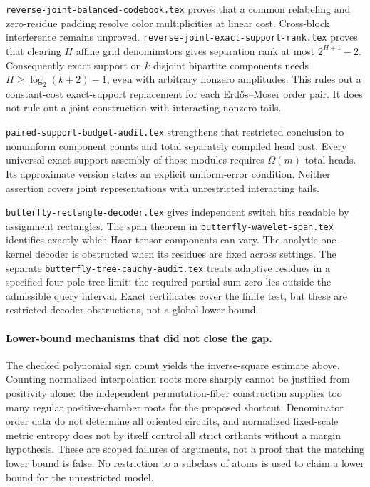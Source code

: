 \documentclass[11pt]{article}
\begin{document}
\texttt{reverse-joint-balanced-codebook.tex} proves that a common
relabeling and zero-residue padding resolve color multiplicities at
linear cost. Cross-block interference remains unproved.
\texttt{reverse-joint-exact-support-rank.tex} proves that clearing
$H$ affine grid denominators gives separation rank at most
$2^{H+1}-2$. Consequently exact support on $k$ disjoint bipartite
components needs $H\geq\log_2(k+2)-1$, even with arbitrary nonzero
amplitudes. This rules out a constant-cost exact-support replacement
for each Erd\H{o}s--Moser order pair. It does not rule out a joint
construction with interacting nonzero tails.

\texttt{paired-support-budget-audit.tex} strengthens that restricted
conclusion to nonuniform component counts and total separately compiled
head cost. Every universal exact-support assembly of those modules
requires $\Omega(m)$ total heads. Its approximate version states an
explicit uniform-error condition. Neither assertion covers joint
representations with unrestricted interacting tails.

\texttt{butterfly-rectangle-decoder.tex} gives independent switch bits
readable by assignment rectangles. The span theorem in
\texttt{butterfly-wavelet-span.tex} identifies exactly which Haar tensor
components can vary. The analytic one-kernel decoder is obstructed
when its residues are fixed across settings. The separate
\texttt{butterfly-tree-cauchy-audit.tex} treats adaptive residues in a
specified four-pole tree limit: the required partial-sum zero lies
outside the admissible query interval. Exact certificates cover the
finite test, but these are restricted decoder obstructions, not a
global lower bound.

\paragraph{Lower-bound mechanisms that did not close the gap.}
The checked polynomial sign count yields the inverse-square estimate
above. Counting normalized interpolation roots more sharply cannot be
justified from positivity alone: the independent permutation-fiber
construction supplies too many regular positive-chamber roots for the
proposed shortcut. Denominator order data do not determine all oriented
circuits, and normalized fixed-scale metric entropy does not by itself
control all strict orthants without a margin hypothesis. These are
scoped failures of arguments, not a proof that the matching lower bound
is false. No restriction to a subclass of atoms is used to claim a
lower bound for the unrestricted model.
\end{document}
